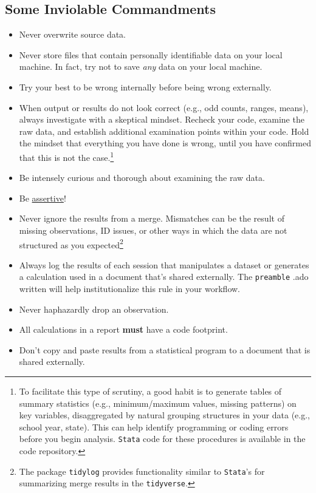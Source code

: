 \documentclass[11pt]{article}
\begin{document}
\subsection{Some Inviolable Commandments}
\begin{itemize}
	\item Never overwrite source data.
	\item Never store files that contain personally identifiable data on your local machine. In fact, try not to save \emph{any} data on your local machine.
	\item Try your best to be wrong internally before being wrong externally.
	\item When output or results do not look correct (e.g., odd counts, ranges, means), always investigate with a skeptical mindset. Recheck your code, examine the raw data, and establish additional examination points within your code. Hold the mindset that everything you have done is wrong, until you have confirmed that this is not the case.\footnote{To facilitate this type of scrutiny, a good habit is to generate tables of summary statistics (e.g., minimum/maximum values, missing patterns) on key variables, disaggregated by natural grouping structures in your data (e.g., school year, state). This can help identify programming or coding errors before you begin analysis. \texttt{Stata} code for these procedures is available in the code repository.}
	\item Be intensely curious and thorough about examining the raw data.
	\item Be \href{https://journals.sagepub.com/doi/pdf/10.1177/1536867X0400300414}{assertive}!
	\item Never ignore the results from a merge. Mismatches can be the result of missing observations, ID issues, or other ways in which the data are not structured as you expected\footnote{The \faRProject package \texttt{tidylog} provides functionality similar to \texttt{Stata}'s for summarizing merge results in the \texttt{tidyverse}.}
	\item Always log the results of each session that manipulates a dataset or generates a calculation used in a document that's shared externally. The \texttt{preamble} .ado written will help institutionalize this rule in your workflow.
	\item Never haphazardly drop an observation.
	\item All calculations in a report \textbf{must} have a code footprint.
	\item Don't copy and paste results from a statistical program to a document that is shared externally.

\end{itemize}
\end{document}
